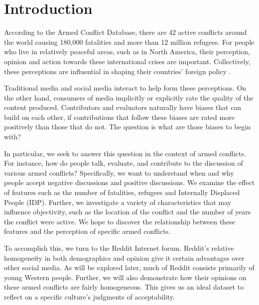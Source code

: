 \section{Introduction}
According to the Armed Conflict Database, there are 42 active conflicts around the world causing 180,000 fatalities and more than 12 million refugees. For people who live in relatively peaceful areas, such as in North America, their perception, opinion and action towards these international crises are important. Collectively, these perceptions are influential in shaping their countries' foreign policy \cite{Gelpi2009}. 

Traditional media and social media interact to help form these perceptions. On the other hand, consumers of media implicitly or explicitly rate the quality of the content produced. Contributors and evaluators naturally have biases that can build on each other, if contributions that follow these biases are rated more positively than those that do not. The question is what are those biases to begin with?

In particular, we seek to answer this question in the context of armed conflicts. For instance, how do people talk, evaluate, and contribute to the discussion of various armed conflicts? Specifically, we want to understand when and why people accept negative discussions and positive discussions. We examine the effect of features such as the number of fatalities, refugees and Internally Displaced People (IDP). Further, we investigate a variety of characteristics that may influence objectivity, such as the location of the conflict and the number of years the conflict were active. We hope to discover the relationship between these features and the perception of specific armed conflicts.

To accomplish this, we turn to the Reddit Internet forum. Reddit's relative homogeneity in both demographics and opinion give it certain advantages over other social media. As will be explored later, much of Reddit consists primarily of young Western people. Further, we will also demonstrate how their opinions on these armed conflicts are fairly homogeneous. This gives us an ideal dataset to reflect on a specific culture's judgments of acceptability.

